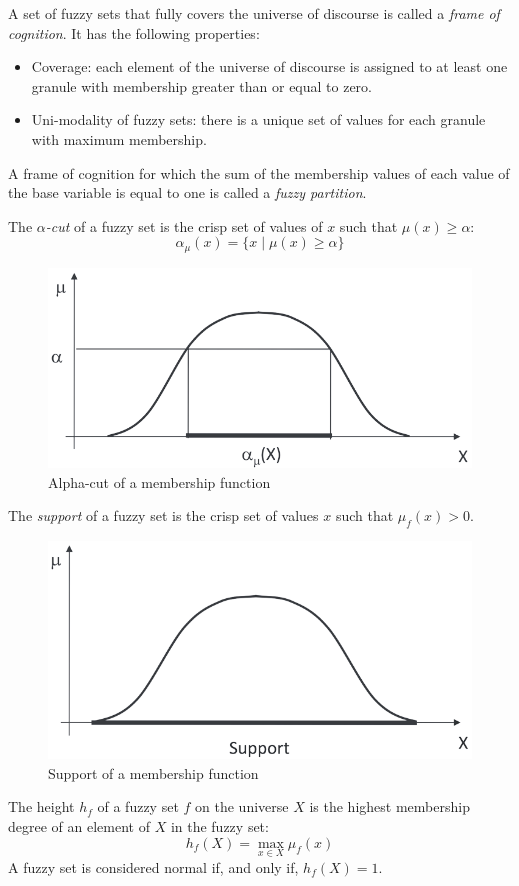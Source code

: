 \begin{definition}
    A set of fuzzy sets that fully covers the universe of discourse is called a \emph{frame of cognition}. It has the following properties:
    \begin{itemize}
        \item Coverage: each element of the universe of discourse is assigned to at least one granule with membership greater than or equal to zero.
        \item Uni-modality of fuzzy sets: there is a unique set of values for each granule with maximum membership. 
    \end{itemize}

    A frame of cognition for which the sum of the membership values of each value of the base variable is equal to one is called a \emph{fuzzy partition}.

    The \emph{$\alpha$-cut} of a fuzzy set is the crisp set of values of $x$ such that $\mu(x) \geq \alpha$:
    \[\alpha_\mu(x)=\{x \mid \mu(x) \geq \alpha\}\]
\end{definition}
\begin{figure}[H]
    \centering
    \includegraphics[width=0.4\linewidth]{images/alpha.png}
    \caption{Alpha-cut of a membership function}
\end{figure}
\begin{definition}
    The \emph{support} of a fuzzy set is the crisp set of values $x$ such that $\mu_f(x)>0$. 
\end{definition}
\begin{figure}[H]
    \centering
    \includegraphics[width=0.4\linewidth]{images/support.png}
    \caption{Support of a membership function}
\end{figure}
\begin{definition}
    The height $h_f$ of a fuzzy set $f$ on the universe $X$ is the highest membership degree of an element of $X$ in the fuzzy set:
    \[h_f(X)=\max_{x \in X}\mu_f(x)\]
    A fuzzy set is considered normal if, and only if, $h_f(X)=1$.
\end{definition}
